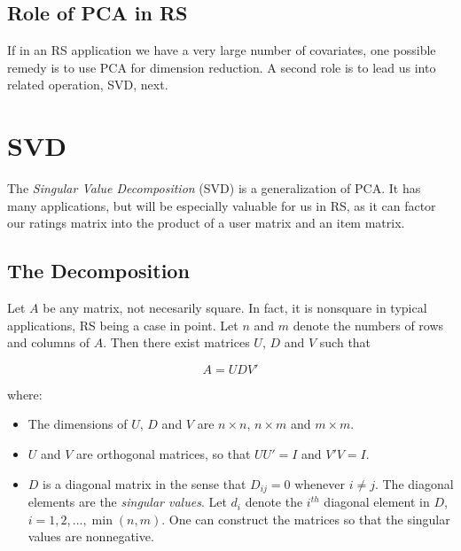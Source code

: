 \subsection{Role of PCA in RS}

If in an RS application we have a very large number of covariates, one
possible remedy is to use PCA for dimension reduction.  A second role is
to lead us into related operation, SVD, next.

\section{SVD}

The \textit{Singular Value Decomposition} (SVD) is a generalization 
of PCA.  It has many applications, but will be especially valuable for
us in RS, as it can factor our ratings matrix into the product of a user
matrix and an item matrix.

\subsection{The Decomposition}

Let $A$ be any matrix, not necesarily square.  In fact, it is nonsquare
in typical applications, RS being a case in point.  Let $n$ and $m$
denote the numbers of rows and columns of $A$.
Then there exist matrices $U$, $D$ and $V$ such that

\begin{equation}
\label{audv}
A = U D V'
\end{equation}

where:

\begin{itemize}

\item The dimensions of $U$, $D$ and $V$ are $n \times n$, $n \times m$
and $m \times m$.

\item $U$ and $V$ are orthogonal matrices, so that $U U' = I$ and $V'V =
I$.

\item $D$ is a diagonal matrix in the sense that $D_{ij} = 0$ whenever
$i \neq j$.  The diagonal elements are the \textit{singular values}.
Let $d_{i}$ denote the $i^{th}$ diagonal element in $D$,
$i = 1,2,...,\min(n,m)$.  One can construct the matrices so that the
singular values are nonnegative.

\end{itemize} 

